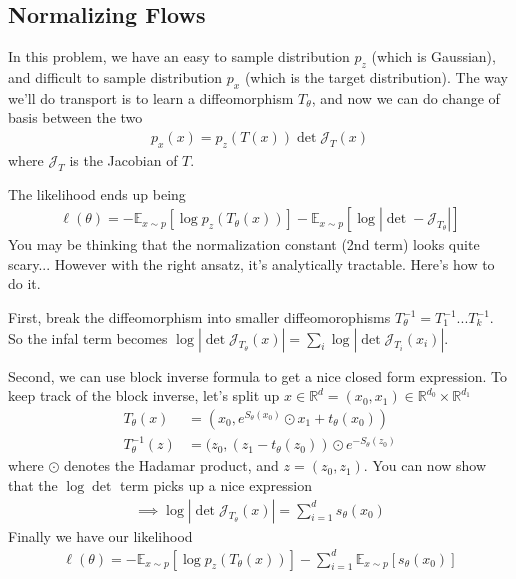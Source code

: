 \subsection{Normalizing Flows}
In this problem, we have an easy to sample distribution $p_z$ (which is Gaussian), and difficult to sample distribution $p_x$ (which is the target distribution). The way we'll do transport is to learn a diffeomorphism $T_\theta$, and now we can do change of basis between the two
\begin{align}
	p_x(x) = p_z(T(x)) \det \mathcal J_{T}(x) 
\end{align}
where $\mathcal J_{T}$ is the Jacobian of $T$.

The likelihood ends up being
\begin{align}
	\ell(\theta) = - \mathbb E_{x \sim p} [\log p_z(T_\theta(x))] - \mathbb E_{x \sim p}[\log |\det - \mathcal J_{T_\theta}| ]
\end{align}
You may be thinking that the normalization constant (2nd term) looks quite scary... However with the right ansatz, it's analytically tractable. Here's how to do it.

First, break the diffeomorphism into smaller diffeomorophisms $T^{-1}_\theta = T_1^{-1} ... T_k^{-1}$. So the infal term becomes $\log |\det \mathcal J_{T_\theta}(x)| = \sum_i \log |\det \mathcal J_{T_i}(x_i)|$. 

Second, we can use block inverse formula to get a nice closed form expression. To keep track of the block inverse, let's split up $x \in \mathbb R^d = (x_0, x_1) \in \mathbb R^{d_0} \times \mathbb R^{d_1}$ 
\begin{align}
	T_\theta(x) & = (x_0, e^{S_\theta(x_0)} \odot x_1 + t_\theta(x_0))\\
	T_\theta^{-1}(z) & = (z_0, (z_1 - t_\theta(z_0)) \odot e^{-S_\theta (z_0)}
\end{align}
where $\odot$ denotes the Hadamar product, and $z = (z_0,z_1)$. You can now show that the $\log \det$ term picks up a nice expression
\begin{align}
	\implies \log |\det \mathcal{J}_{T_\theta}(x)| = \sum_{i=1}^d s_\theta(x_0)
\end{align}
Finally we have our likelihood
\begin{align}
	\ell(\theta) = - \mathbb E_{x \sim p} [\log p_z(T_\theta(x))] - \sum_{i=1}^d \mathbb E_{x \sim p}[ s_\theta(x_0)]
\end{align}

